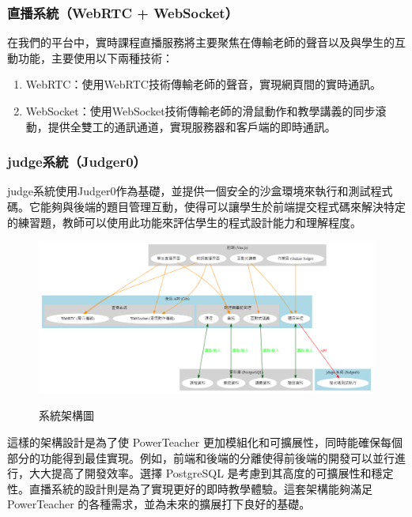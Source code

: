 \documentclass[12pt]{article}
\begin{document}
\subsubsection{直播系統（WebRTC + WebSocket）}
在我們的平台中，實時課程直播服務將主要聚焦在傳輸老師的聲音以及與學生的互動功能，主要使用以下兩種技術：

\begin{enumerate}[label=\textbullet, noitemsep]
  \item WebRTC：使用WebRTC技術傳輸老師的聲音，實現網頁間的實時通訊。
  \item WebSocket：使用WebSocket技術傳輸老師的滑鼠動作和教學講義的同步滾動，提供全雙工的通訊通道，實現服務器和客戶端的即時通訊。
\end{enumerate}

\subsubsection{judge系統（Judger0）}
judge系統使用Judger0作為基礎，並提供一個安全的沙盒環境來執行和測試程式碼。它能夠與後端的題目管理互動，使得可以讓學生於前端提交程式碼來解決特定的練習題，教師可以使用此功能來評估學生的程式設計能力和理解程度。\\

\begin{figure}[htb]
  \centering
  \href{https://raw.githubusercontent.com/programingtw/proglearn-plan/main/img/powerteacherarc.png}{
    \includegraphics[width=\textwidth]{../img/powerteacherarc.png}
  }
  \caption{系統架構圖}
  \label{arc1}            
\end{figure}

這樣的架構設計是為了使 PowerTeacher 更加模組化和可擴展性，同時能確保每個部分的功能得到最佳實現。例如，前端和後端的分離使得前後端的開發可以並行進行，大大提高了開發效率。選擇 PostgreSQL 是考慮到其高度的可擴展性和穩定性。直播系統的設計則是為了實現更好的即時教學體驗。這套架構能夠滿足 PowerTeacher 的各種需求，並為未來的擴展打下良好的基礎。
\end{document}
